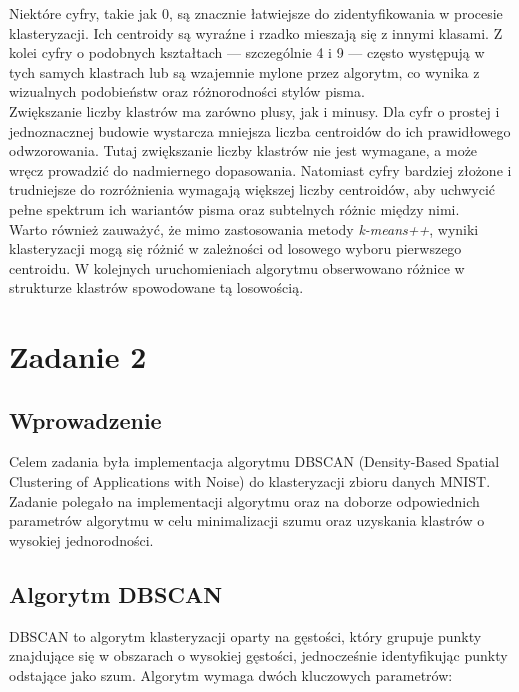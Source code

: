 \documentclass[12pt,a4paper]{article}
\begin{document}
\noindent Niektóre cyfry, takie jak 0, są znacznie łatwiejsze do zidentyfikowania w procesie klasteryzacji. Ich centroidy są wyraźne i rzadko mieszają się z innymi klasami. Z kolei cyfry o podobnych kształtach — szczególnie 4 i 9 — często występują w tych samych klastrach lub są wzajemnie mylone przez algorytm, co wynika z wizualnych podobieństw oraz różnorodności stylów pisma. \\

\noindent Zwiększanie liczby klastrów ma zarówno plusy, jak i minusy. Dla cyfr o prostej i jednoznacznej budowie wystarcza mniejsza liczba centroidów do ich prawidłowego odwzorowania. Tutaj zwiększanie liczby klastrów nie jest wymagane, a może wręcz prowadzić do nadmiernego dopasowania. Natomiast cyfry bardziej złożone i trudniejsze do rozróżnienia wymagają większej liczby centroidów, aby uchwycić pełne spektrum ich wariantów pisma oraz subtelnych różnic między nimi. \\

\noindent Warto również zauważyć, że mimo zastosowania metody \textit{k-means++}, wyniki klasteryzacji mogą się różnić w zależności od losowego wyboru pierwszego centroidu. W kolejnych uruchomieniach algorytmu obserwowano różnice w strukturze klastrów spowodowane tą losowością.

\section{Zadanie 2}

\subsection{Wprowadzenie}

Celem zadania była implementacja algorytmu DBSCAN (Density-Based Spatial Clustering of Applications with Noise) do klasteryzacji zbioru danych MNIST. Zadanie polegało na implementacji algorytmu oraz na doborze odpowiednich parametrów algorytmu w celu minimalizacji szumu oraz uzyskania klastrów o wysokiej jednorodności.

\subsection{Algorytm DBSCAN}

DBSCAN to algorytm klasteryzacji oparty na gęstości, który grupuje punkty znajdujące się w obszarach o wysokiej gęstości, jednocześnie identyfikując punkty odstające jako szum. Algorytm wymaga dwóch kluczowych parametrów:
\end{document}
